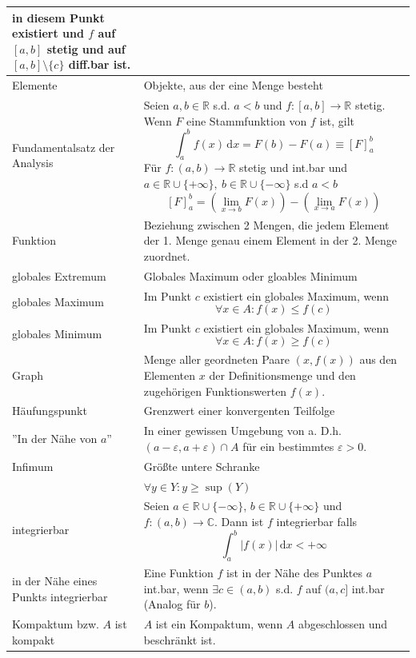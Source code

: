 \documentclass{article}
\newcommand{\diff}{\mathrm{d}}
\newcommand{\lr}[1]{\left(#1\right)}
\begin{document}
\begin{xltabular}{\linewidth}{p{6cm}|X}
			in diesem Punkt existiert und $f$ auf $[a,b]$ stetig und auf $[a,b]\setminus\{c\}$ diff.bar ist. \\
	\hline
		Elemente & Objekte, aus der eine Menge besteht \\
	\hline
		Fundamentalsatz der Analysis & Seien $a,b\in\mathbb{R}$ s.d. $a < b$ und $f:[a,b]\rightarrow\mathbb{R}$ stetig. Wenn $F$ eine Stammfunktion von $f$ ist, gilt
			$$\int_a^b f(x)\,\diff x = F(b) - F(a) \equiv [F]_a^b$$
			Für $f:(a,b)\rightarrow\mathbb{R}$ stetig und int.bar und $a\in\mathbb{R}\cup \{+\infty\},\ b\in\mathbb{R}\cup\{-\infty\}$ s.d $a < b$
				$$[F]_a^b = \lr{\lim\limits_{x\rightarrow b} F(x)} - \lr{\lim\limits_{x\rightarrow a} F(x)}$$\\
	\hline
		Funktion & Beziehung zwischen 2 Mengen, die jedem Element der 1. Menge genau einem Element in der 2. Menge zuordnet.\\
	\hline
		globales Extremum & Globales Maximum oder gloables Minimum \\
	\hline
		globales Maximum & Im Punkt $c$ existiert ein globales Maximum, wenn
		$$\forall x\in A: f(x)\leq f(c)$$ \\
	\hline
		globales Minimum & Im Punkt $c$ existiert ein globales Maximum, wenn
		$$\forall x\in A: f(x)\geq f(c)$$ \\
	\hline
		Graph & Menge aller geordneten Paare $(x,f(x))$ aus den Elementen $x$ der Definitionsmenge und den zugehörigen Funktionswerten $f(x)$.\\
	\hline
		Häufungspunkt & Grenzwert einer konvergenten Teilfolge \\
	\hline
		''In der Nähe von $a$'' & In einer gewissen Umgebung von a. D.h. $(a - \varepsilon, a + \varepsilon)\cap A$ für ein bestimmtes $\varepsilon > 0$. \\
	 \hline
	 	Infimum & Größte untere Schranke \\
	 	& $\forall y\in Y: y\geq \sup(Y)$ \\
	\hline
		integrierbar & Seien $a\in\mathbb{R}\cup \{-\infty\}$, $b\in\mathbb{R}\cup \{+\infty\}$ und $f:(a,b)\rightarrow\mathbb{C}$. Dann ist $f$ integrierbar falls
			$$\int_a^b |f(x)|\,\diff x < +\infty$$\\
		in der Nähe eines Punkts integrierbar & Eine Funktion $f$ ist in der Nähe des Punktes $a$ int.bar, wenn $\exists c\in(a,b)$ s.d. $f$ auf $(a,c]$ int.bar (Analog für $b$). \\
	\hline
		Kompaktum bzw. $A$ ist kompakt & $A$ ist ein Kompaktum, wenn $A$ abgeschlossen und beschränkt ist. \\

\end{xltabular}
\end{document}
